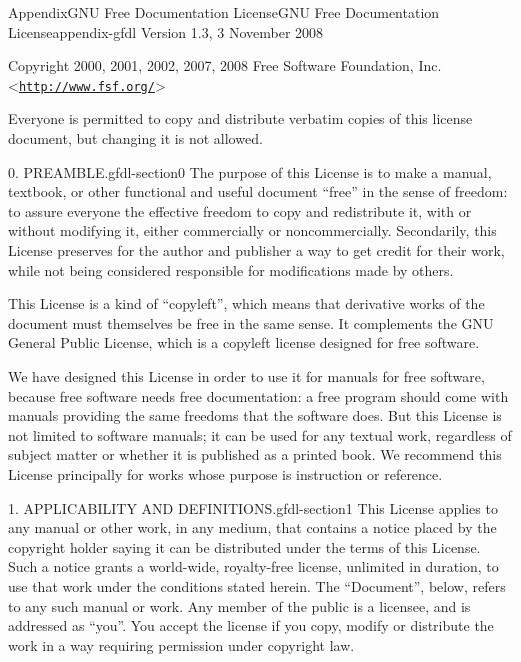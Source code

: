 \documentclass[oneside,10pt,]{book}
\numberwithin{equation}{section}
\begin{document}
%
%
\typeout{************************************************}
\typeout{************************************************}
%
\begin{appendixptx}{Appendix}{GNU Free Documentation License}{}{GNU Free Documentation License}{}{}{appendix-gfdl}
\renewcommand*{\appendixname}{Appendix}
Version 1.3, 3 November 2008%
\par
Copyright \textcopyright{} 2000, 2001, 2002, 2007, 2008 Free Software Foundation, Inc. \textless{}\href{http://www.fsf.org/}{\nolinkurl{http://www.fsf.org/}}\textgreater{}%
\par
Everyone is permitted to copy and distribute verbatim copies of this license document, but changing it is not allowed.%
\begin{paragraphs}{0. PREAMBLE.}{gfdl-section0}%
The purpose of this License is to make a manual, textbook, or other functional and useful document ``free'' in the sense of freedom: to assure everyone the effective freedom to copy and redistribute it, with or without modifying it, either commercially or noncommercially. Secondarily, this License preserves for the author and publisher a way to get credit for their work, while not being considered responsible for modifications made by others.%
\par
This License is a kind of ``copyleft'', which means that derivative works of the document must themselves be free in the same sense. It complements the GNU General Public License, which is a copyleft license designed for free software.%
\par
We have designed this License in order to use it for manuals for free software, because free software needs free documentation: a free program should come with manuals providing the same freedoms that the software does. But this License is not limited to software manuals; it can be used for any textual work, regardless of subject matter or whether it is published as a printed book. We recommend this License principally for works whose purpose is instruction or reference.%
\end{paragraphs}%
\begin{paragraphs}{1. APPLICABILITY AND DEFINITIONS.}{gfdl-section1}%
This License applies to any manual or other work, in any medium, that contains a notice placed by the copyright holder saying it can be distributed under the terms of this License. Such a notice grants a world-wide, royalty-free license, unlimited in duration, to use that work under the conditions stated herein. The ``Document'', below, refers to any such manual or work. Any member of the public is a licensee, and is addressed as ``you''. You accept the license if you copy, modify or distribute the work in a way requiring permission under copyright law.%

\end{paragraphs}
\end{appendixptx}
\end{document}
